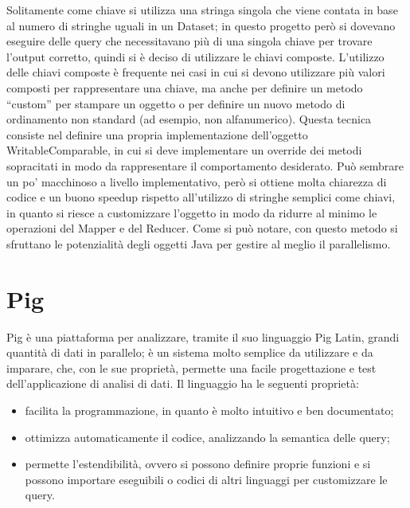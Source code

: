 \documentclass[11pt]{report} %
\begin{document}
Solitamente come chiave si utilizza una stringa singola che viene contata in base al numero di stringhe uguali in un Dataset; in questo progetto però si dovevano eseguire delle query che necessitavano più di una singola chiave per trovare l'output corretto, quindi si è deciso di utilizzare le chiavi composte.  L'utilizzo delle chiavi composte è frequente nei casi in cui si devono utilizzare più valori composti per rappresentare una chiave, ma anche per definire un metodo ``custom'' per stampare un oggetto o per definire un nuovo metodo di ordinamento non standard (ad esempio, non alfanumerico). Questa tecnica consiste nel definire una propria implementazione dell'oggetto WritableComparable, in cui si deve implementare un override dei metodi sopracitati in modo da rappresentare il comportamento desiderato. Può sembrare un po' macchinoso a livello implementativo, però si ottiene molta chiarezza di codice e un buono speedup rispetto all'utilizzo di stringhe semplici come chiavi, in quanto si riesce a customizzare l'oggetto in modo da ridurre al minimo le operazioni del Mapper e del Reducer. Come si può notare, con questo metodo si sfruttano le potenzialità degli oggetti Java per gestire al meglio il parallelismo.

\section{Pig}

Pig è una piattaforma per analizzare, tramite il suo linguaggio Pig Latin, grandi quantità di dati in parallelo; è un sistema molto semplice da utilizzare e da imparare, che, con le sue proprietà, permette una facile progettazione e test dell'applicazione di analisi di dati. Il linguaggio ha le seguenti proprietà:
\begin{itemize}
\item facilita la programmazione, in quanto è molto intuitivo e ben documentato;
\item ottimizza automaticamente il codice, analizzando la semantica delle query;
\item permette l'estendibilità, ovvero si possono definire proprie funzioni e si possono importare eseguibili o codici di altri linguaggi per customizzare le query.
\end{itemize}
\end{document}
